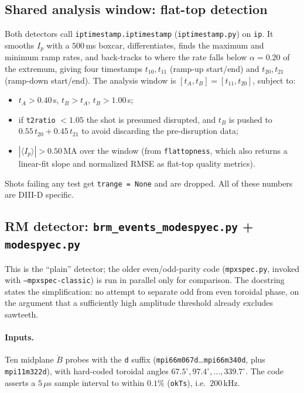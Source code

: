 \documentclass[11pt,a4paper]{article}
\newcommand{\code}[1]{\texttt{\small #1}}
\newcommand{\bk}{\discretionary{}{}{}}   %
\begin{document}
\subsection{Shared analysis window: flat-top detection}

Both detectors call \code{iptimestamp.iptimestamp} (\code{iptimestamp.py}) on \code{ip}. It smooths
$I_p$ with a $500$\,ms boxcar, differentiates, finds the maximum and minimum ramp rates, and
back-tracks to where the rate falls below $\alpha=0.20$ of the extremum, giving four timestamps
$t_{10},t_{11}$ (ramp-up start/end) and $t_{20},t_{21}$ (ramp-down start/end). The analysis window
is $[t_A,t_B]=[t_{11},t_{20}]$, subject to:

\begin{itemize}[leftmargin=2em,noitemsep]
\item $t_A > 0.40$\,s, $t_B > t_A$, $t_B > 1.00$\,s;
\item if \code{t2ratio} $< 1.05$ the shot is presumed disrupted, and $t_B$ is pushed to
$0.55\,t_{20} + 0.45\,t_{21}$ to avoid discarding the pre-disruption data;
\item $|\langle I_p\rangle| > 0.50$\,MA over the window (from \code{flattopness}, which also
returns a linear-fit slope and normalized RMSE as flat-top quality metrics).
\end{itemize}

Shots failing any test get \code{trange = None} and are dropped. All of these numbers are DIII-D
specific.

\subsection{RM detector: \code{brm\_\bk events\_\bk modespyec.py} + \code{modespyec.py}}

This is the ``plain'' detector; the older even/odd-parity code (\code{mpxspec.py}, invoked with
\code{--mpxspec-classic}) is run in parallel only for comparison. The docstring states the
simplification: no attempt to separate odd from even toroidal phase, on the argument that a
sufficiently high amplitude threshold already excludes sawteeth.

\paragraph{Inputs.} Ten midplane $\dot B$ probes with the \code{d} suffix
(\code{mpi66m067d}\dots\code{mpi66m340d}, plus \code{mpi11m322d}), with hard-coded toroidal angles
$67.5^\circ, 97.4^\circ, \dots, 339.7^\circ$. The code asserts a $5\,\mu$s sample interval to within
$0.1\%$ (\code{okTs}), i.e.\ $200$\,kHz.
\end{document}

